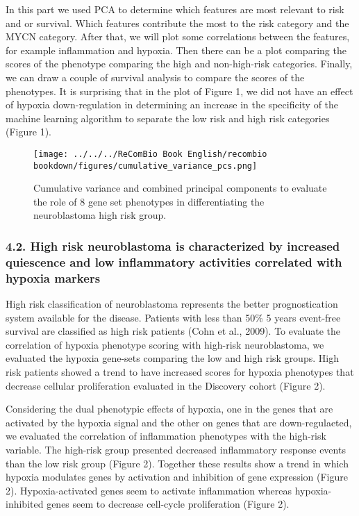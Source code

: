 \documentclass[
]{article}
\begin{document}
In this part we used PCA to determine which features are most relevant
to risk and or survival. Which features contribute the most to the risk
category and the MYCN category. After that, we will plot some
correlations between the features, for example inflammation and hypoxia.
Then there can be a plot comparing the scores of the phenotype comparing
the high and non-high-risk categories. Finally, we can draw a couple of
survival analysis to compare the scores of the phenotypes. It is
surprising that in the plot of Figure 1, we did not have an effect of
hypoxia down-regulation in determining an increase in the specificity of
the machine learning algorithm to separate the low risk and high risk
categories (Figure 1).

\begin{figure}
\centering
\texttt{[image: ../../../ReComBio Book English/recombio bookdown/figures/cumulative\_variance\_pcs.png]}
\caption{Cumulative variance and combined principal components to
evaluate the role of 8 gene set phenotypes in differentiating the
neuroblastoma high risk group.}
\end{figure}

\hypertarget{high-risk-neuroblastoma-is-characterized-by-increased-quiescence-and-low-inflammatory-activities-correlated-with-hypoxia-markers}{%
\subsubsection{4.2. High risk neuroblastoma is characterized by
increased quiescence and low inflammatory activities correlated with
hypoxia
markers}\label{high-risk-neuroblastoma-is-characterized-by-increased-quiescence-and-low-inflammatory-activities-correlated-with-hypoxia-markers}}

High risk classification of neuroblastoma represents the better
prognostication system available for the disease. Patients with less
than 50\% 5 years event-free survival are classified as high risk
patients (Cohn et al., 2009). To evaluate the correlation of hypoxia
phenotype scoring with high-risk neuroblastoma, we evaluated the hypoxia
gene-sets comparing the low and high risk groups. High risk patients
showed a trend to have increased scores for hypoxia phenotypes that
decrease cellular proliferation evaluated in the Discovery cohort
(Figure 2).

Considering the dual phenotypic effects of hypoxia, one in the genes
that are activated by the hypoxia signal and the other on genes that are
down-regulaeted, we evaluated the correlation of inflammation phenotypes
with the high-risk variable. The high-risk group presented decreased
inflammatory response events than the low risk group (Figure 2).
Together these results show a trend in which hypoxia modulates genes by
activation and inhibition of gene expression (Figure 2).
Hypoxia-activated genes seem to activate inflammation whereas
hypoxia-inhibited genes seem to decrease cell-cycle proliferation
(Figure 2).
\end{document}
